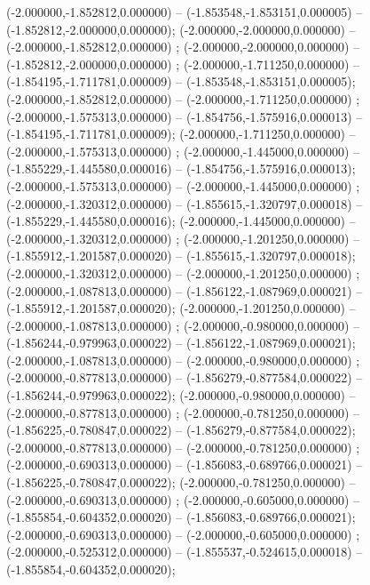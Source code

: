  (-2.000000,-1.852812,0.000000) -- (-1.853548,-1.853151,0.000005) -- (-1.852812,-2.000000,0.000000);
 (-2.000000,-2.000000,0.000000) -- (-2.000000,-1.852812,0.000000) ;
 (-2.000000,-2.000000,0.000000) -- (-1.852812,-2.000000,0.000000) ;
 (-2.000000,-1.711250,0.000000) -- (-1.854195,-1.711781,0.000009) -- (-1.853548,-1.853151,0.000005);
 (-2.000000,-1.852812,0.000000) -- (-2.000000,-1.711250,0.000000) ;
 (-2.000000,-1.575313,0.000000) -- (-1.854756,-1.575916,0.000013) -- (-1.854195,-1.711781,0.000009);
 (-2.000000,-1.711250,0.000000) -- (-2.000000,-1.575313,0.000000) ;
 (-2.000000,-1.445000,0.000000) -- (-1.855229,-1.445580,0.000016) -- (-1.854756,-1.575916,0.000013);
 (-2.000000,-1.575313,0.000000) -- (-2.000000,-1.445000,0.000000) ;
 (-2.000000,-1.320312,0.000000) -- (-1.855615,-1.320797,0.000018) -- (-1.855229,-1.445580,0.000016);
 (-2.000000,-1.445000,0.000000) -- (-2.000000,-1.320312,0.000000) ;
 (-2.000000,-1.201250,0.000000) -- (-1.855912,-1.201587,0.000020) -- (-1.855615,-1.320797,0.000018);
 (-2.000000,-1.320312,0.000000) -- (-2.000000,-1.201250,0.000000) ;
 (-2.000000,-1.087813,0.000000) -- (-1.856122,-1.087969,0.000021) -- (-1.855912,-1.201587,0.000020);
 (-2.000000,-1.201250,0.000000) -- (-2.000000,-1.087813,0.000000) ;
 (-2.000000,-0.980000,0.000000) -- (-1.856244,-0.979963,0.000022) -- (-1.856122,-1.087969,0.000021);
 (-2.000000,-1.087813,0.000000) -- (-2.000000,-0.980000,0.000000) ;
 (-2.000000,-0.877813,0.000000) -- (-1.856279,-0.877584,0.000022) -- (-1.856244,-0.979963,0.000022);
 (-2.000000,-0.980000,0.000000) -- (-2.000000,-0.877813,0.000000) ;
 (-2.000000,-0.781250,0.000000) -- (-1.856225,-0.780847,0.000022) -- (-1.856279,-0.877584,0.000022);
 (-2.000000,-0.877813,0.000000) -- (-2.000000,-0.781250,0.000000) ;
 (-2.000000,-0.690313,0.000000) -- (-1.856083,-0.689766,0.000021) -- (-1.856225,-0.780847,0.000022);
 (-2.000000,-0.781250,0.000000) -- (-2.000000,-0.690313,0.000000) ;
 (-2.000000,-0.605000,0.000000) -- (-1.855854,-0.604352,0.000020) -- (-1.856083,-0.689766,0.000021);
 (-2.000000,-0.690313,0.000000) -- (-2.000000,-0.605000,0.000000) ;
 (-2.000000,-0.525312,0.000000) -- (-1.855537,-0.524615,0.000018) -- (-1.855854,-0.604352,0.000020);
